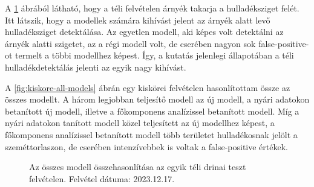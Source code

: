 A \ref{fig:drina-winter-all-models} ábrából látható, hogy a téli felvételen árnyék takarja a hulladéksziget felét. Itt látszik, hogy a modellek számára kihívást jelent az árnyék alatt levő hulladéksziget detektálása. Az egyetlen modell, aki képes volt detektálni az árnyék alatti szigetet, az a régi modell volt, de cserében nagyon sok false-positive-ot termelt a többi modellhez képest. Így, a kutatás jelenlegi állapotában a téli hulladékdetektálás jelenti az egyik nagy kihívást.

A \ref{fig:kiskore-all-models} ábrán egy kiskörei felvételen hasonlítottam össze az összes modellt. A három legjobban teljesítő modell az új modell, a nyári adatokon betanított új modell, illetve a főkomponens analízissel betanított modell. Míg a nyári adatokon tanított modell közel teljesített az új modellhez képest, a főkomponens analízissel betanított modell több területet hulladékosnak jelölt a szeméttorlaszon, de cserében intenzívebbek is voltak a false-positive értékek.

\begin{figure}[H]
	\centering
	\hspace{5pt}
	\hspace{5pt}
	\hspace{5pt}
	\hspace{5pt}
	\hspace{5pt}
	\caption{Az összes modell összehasonlítása az egyik téli drinai teszt felvételen. Felvétel dátuma: 2023.12.17.}
	\label{fig:drina-winter-all-models}
\end{figure}

